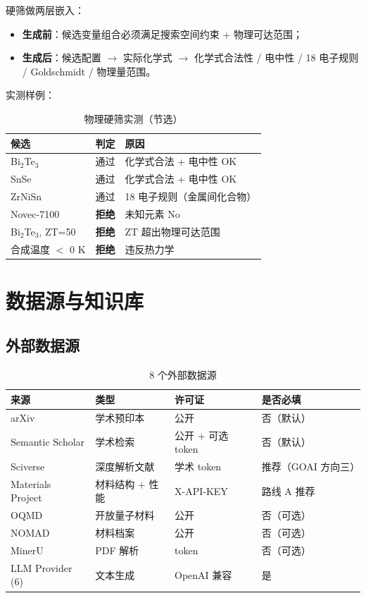 \documentclass[11pt,a4paper]{article}
\begin{document}
硬筛做两层嵌入：

\begin{itemize}[leftmargin=2em]
\item \textbf{生成前}：候选变量组合必须满足搜索空间约束 + 物理可达范围；
\item \textbf{生成后}：候选配置 $\to$ 实际化学式 $\to$ 化学式合法性 / 电中性 / 18 电子规则 / Goldschmidt / 物理量范围。
\end{itemize}

实测样例：

\begin{table}[h]
\centering
\small
\caption{物理硬筛实测（节选）}
\begin{tabular}{@{}lll@{}}
\toprule
\textbf{候选} & \textbf{判定} & \textbf{原因} \\
\midrule
Bi$_2$Te$_3$ & 通过 & 化学式合法 + 电中性 OK \\
SnSe & 通过 & 化学式合法 + 电中性 OK \\
ZrNiSn & 通过 & 18 电子规则（金属间化合物）\\
Novec-7100 & \textbf{拒绝} & 未知元素 No \\
Bi$_2$Te$_3$, ZT=50 & \textbf{拒绝} & ZT 超出物理可达范围 \\
合成温度 $<$ 0 K & \textbf{拒绝} & 违反热力学 \\
\bottomrule
\end{tabular}
\end{table}

\section{数据源与知识库}

\subsection{外部数据源}

\begin{table}[h]
\centering
\small
\caption{8 个外部数据源}
\begin{tabular}{@{}llll@{}}
\toprule
\textbf{来源} & \textbf{类型} & \textbf{许可证} & \textbf{是否必填} \\
\midrule
arXiv & 学术预印本 & 公开 & 否（默认）\\
Semantic Scholar & 学术检索 & 公开 + 可选 token & 否（默认）\\
Sciverse & 深度解析文献 & 学术 token & 推荐（GOAI 方向三）\\
Materials Project & 材料结构 + 性能 & X-API-KEY & 路线 A 推荐 \\
OQMD & 开放量子材料 & 公开 & 否（可选）\\
NOMAD & 材料档案 & 公开 & 否（可选）\\
MinerU & PDF 解析 & token & 否（可选）\\
LLM Provider (6) & 文本生成 & OpenAI 兼容 & 是 \\
\bottomrule
\end{tabular}
\end{table}
\end{document}
